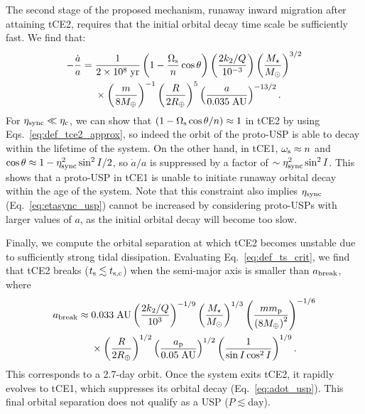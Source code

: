 \documentclass[
        fleqn,
        usenatbib,
    ]{mnras}
\newcommand*{\p}[1]{\left(#1\right)}
\begin{document}
The second stage of the proposed mechanism, runaway inward migration after
attaining tCE2, requires that the initial orbital decay time scale be
sufficiently fast. We find that:
\begin{align}
    -\frac{\dot{a}}{a} ={}& \frac{1}{2 \times 10^8\;\mathrm{yr}}
            \p{1 - \frac{\Omega_{\rm s}}{n}\cos \theta}
            \p{\frac{2k_2/Q}{10^{-3}}}
            \p{\frac{M_\star}{M_{\odot}}}^{3/2}\nonumber\\
        &\times \p{\frac{m}{8M_{\oplus}}}^{-1}
            \p{\frac{R}{2R_{\oplus}}}^5
            \p{\frac{a}{0.035\;\mathrm{AU}}}^{-13/2}.
            \label{eq:adot_usp}
\end{align}
For $\eta_{\rm sync} \ll \eta_{\rm c}$, we can show that $\p{1 - \Omega_{\rm
s}\cos \theta / n} \approx 1$ in tCE2 by using Eqs.~\eqref{eq:def_tce2_approx},
so indeed the orbit of the proto-USP is able to decay within the lifetime of the
system. On the other hand, in tCE1, $\omega_{\rm s} \approx n$ and $\cos \theta
\approx 1 - \eta_{\rm sync}^2 \sin^2 I / 2$, so $\dot{a} / a$ is suppressed by a
factor of $\sim \eta_{\rm sync}^2 \sin^2 I$. This shows that a proto-USP in tCE1
is unable to initiate runaway orbital decay within the age of the system.
Note that this constraint also implies $\eta_{\rm sync}$
(Eq.~\ref{eq:etasync_usp}) cannot be increased by considering proto-USPs with
larger values of $a$, as the initial orbital decay will become too slow.

Finally, we compute the orbital separation at which tCE2 becomes unstable due to
sufficiently strong tidal dissipation. Evaluating Eq.~\eqref{eq:def_ts_crit}, we
find that tCE2 breaks ($t_{\rm s} \lesssim t_{\rm s, c}$) when the semi-major
axis is smaller than $a_{\rm break}$, where
\begin{align}
    a_{\rm break} \approx{}& 0.033 \;\mathrm{AU}
        \p{\frac{2k_2/Q}{10^{3}}}^{-1/9}
        \p{\frac{M_\star}{M_{\odot}}}^{1/3}
        \p{\frac{mm_{\rm p}}{\p{8M_{\oplus}}^2}}^{-1/6}\nonumber\\
        &\times \p{\frac{R}{2R_{\oplus}}}^{1/2}
        \p{\frac{a_{\rm p}}{0.05\;\mathrm{AU}}}^{1/2}
        \p{\frac{1}{\sin I \cos^2 I}}^{1/9}.
\end{align}
This corresponds to a 2.7-day orbit. Once the system exits tCE2, it rapidly
evolves to tCE1, which suppresses its orbital decay (Eq.~\ref{eq:adot_usp}).
This final orbital separation does not qualify as a USP ($P \lesssim
\mathrm{day}$).
\end{document}
